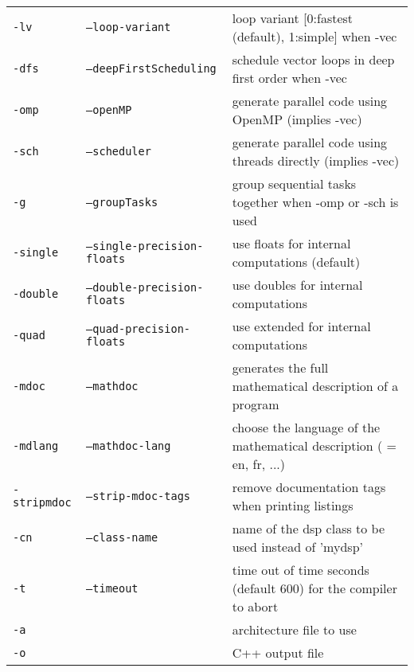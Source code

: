 \begin{supertabular}{|p{1.5cm}|p{4cm}|p{5cm}|}
\texttt{-lv }		& \texttt{--loop-variant }	& loop variant [0:fastest (default), 1:simple] when -vec\\
\texttt{-dfs} 				& \texttt{--deepFirstScheduling}	& schedule vector loops in deep first order when -vec \\
\hline
\texttt{-omp} 				& \texttt{--openMP}					& generate parallel code using OpenMP (implies -vec)  \\
\texttt{-sch} 				& \texttt{--scheduler}				& generate parallel code using threads directly (implies -vec)  \\
\texttt{-g} 				& \texttt{--groupTasks}				& group sequential tasks together when -omp or -sch is used \\
\hline
\texttt{-single} 			& \texttt{--single-precision-floats} & use floats for internal computations (default)  \\
\texttt{-double} 			& \texttt{--double-precision-floats} & use doubles for internal computations  \\
\texttt{-quad} 				& \texttt{--quad-precision-floats}	&  use extended for internal computations  \\
\hline
\texttt{-mdoc} 				& \texttt{--mathdoc}				& generates the full mathematical description of a \faust program \\
\texttt{-mdlang }			& \texttt{--mathdoc-lang } 		& choose the language of the mathematical description ( = en, fr, ...) \\
\texttt{-stripmdoc} 			& \texttt{--strip-mdoc-tags}		& remove documentation tags when printing \faust listings\\
\hline
\texttt{-cn } 	& \texttt{--class-name }	& name of the dsp class to be used instead of 'mydsp' \\
\texttt{-t } 	& \texttt{--timeout }	& time out of time seconds (default 600) for the compiler to abort \\
\texttt{-a } 	&  									& architecture file to use  \\
\texttt{-o } 	&  									& C++ output file\\
\end{supertabular} 
\normalsize

\bigskip
